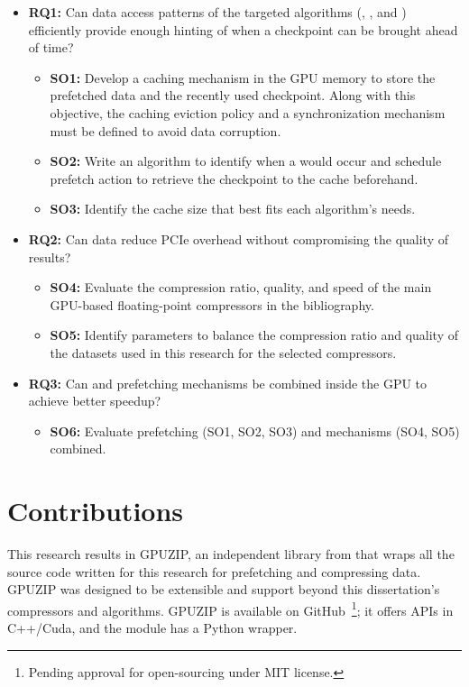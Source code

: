 \documentclass[Ingles]{ic-tese-v3}
\begin{document}
\begin{itemize}
    \item \textbf{RQ1:} Can data access patterns of the targeted \checkpointing algorithms (\revolve, \zcut, and \uniform) efficiently provide enough hinting of when a checkpoint can be brought ahead of time?
    \begin{itemize}
        \item \textbf{SO1:} Develop a caching mechanism in the GPU memory to store the prefetched data and the recently used checkpoint. Along with this objective, the caching eviction policy and a synchronization mechanism must be defined to avoid data corruption.
        \item \textbf{SO2:} Write an algorithm to identify when a  would occur and schedule prefetch action to retrieve the checkpoint to the cache beforehand.
        \item \textbf{SO3:} Identify the cache size that best fits each \checkpointing algorithm's needs.
    \end{itemize}
    
    \item \textbf{RQ2:} Can data \compression reduce PCIe overhead without compromising the quality of results?
    \begin{itemize}
        \item \textbf{SO4:} Evaluate the compression ratio, quality, and speed of the main GPU-based floating-point compressors in the bibliography.
        \item \textbf{SO5:} Identify \compression parameters to balance the compression ratio and quality of the datasets used in this research for the selected compressors.
    \end{itemize}
    
    \item \textbf{RQ3:} Can \compression and prefetching mechanisms be combined inside the GPU to achieve better speedup?
    \begin{itemize}
        \item \textbf{SO6:} Evaluate prefetching (SO1, SO2, SO3) and \compression mechanisms (SO4, SO5) combined.
    \end{itemize}
\end{itemize}

\section{Contributions}
This research results in GPUZIP, an independent library from \awave that wraps all the source code written for this research for prefetching and compressing \checkpointing data. GPUZIP was designed to be extensible and support beyond this dissertation's compressors and \checkpointing algorithms. GPUZIP is available on GitHub~\cite{githubrepo}\footnote{Pending approval for open-sourcing under MIT license.}; it offers APIs in C++/Cuda, and the \compression module has a Python wrapper.
\end{document}
